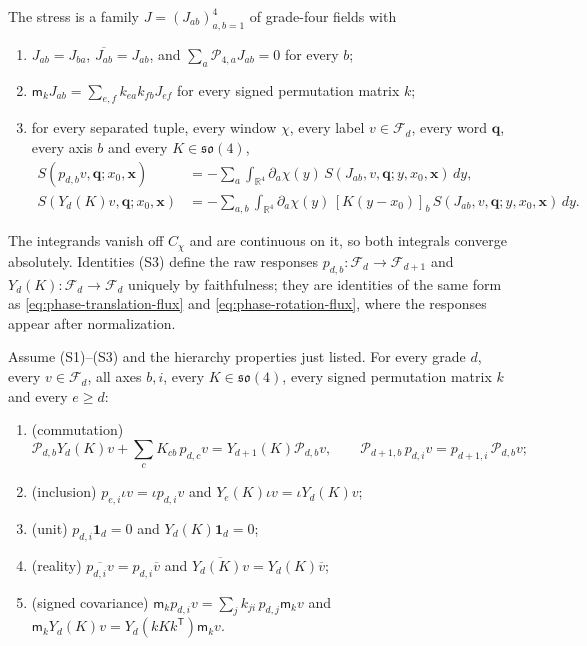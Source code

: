 The stress is a family $J=(J_{ab})_{a,b=1}^4$ of grade-four fields with
\begin{enumerate}
\item[(S1)] $J_{ab}=J_{ba}$, $\overline{J_{ab}}=J_{ab}$, and
  $\sum_a\mathcal P_{4,a}J_{ab}=0$ for every $b$;
\item[(S2)] $\mathsf m_kJ_{ab}=\sum_{e,f}k_{ea}k_{fb}J_{ef}$ for every
  signed permutation matrix $k$;
\item[(S3)] for every separated tuple, every window $\chi$, every label
  $v\in\mathcal F_d$, every word $\boldsymbol q$, every axis $b$ and every
  $K\in\mathfrak{so}(4)$,
\begin{align}
 S(p_{d,b}v,\boldsymbol q;x_0,\boldsymbol x)
 &=-\sum_a\int_{\mathbb R^4}\partial_a\chi(y)\,
     S(J_{ab},v,\boldsymbol q;y,x_0,\boldsymbol x)\,dy,
 \label{eq:ward-raw-translation-flux}\\
 S(Y_d(K)v,\boldsymbol q;x_0,\boldsymbol x)
 &=-\sum_{a,b}\int_{\mathbb R^4}\partial_a\chi(y)\,[K(y-x_0)]_b\,
     S(J_{ab},v,\boldsymbol q;y,x_0,\boldsymbol x)\,dy.
 \label{eq:ward-raw-rotation-flux}
\end{align}
\end{enumerate}
The integrands vanish off $C_\chi$ and are continuous on it, so both
integrals converge absolutely.  Identities (S3) define the raw responses
$p_{d,b}:\mathcal F_d\to\mathcal F_{d+1}$ and
$Y_d(K):\mathcal F_d\to\mathcal F_d$ uniquely by faithfulness; they are
identities of the same form as \eqref{eq:phase-translation-flux} and
\eqref{eq:phase-rotation-flux}, where the responses appear after
normalization.

\begin{lemma}\label{lem:ward-local-response-laws}
Assume (S1)--(S3) and the hierarchy properties just listed.  For every
grade $d$, every $v\in\mathcal F_d$, all axes $b,i$, every
$K\in\mathfrak{so}(4)$, every signed permutation matrix $k$ and every
$e\ge d$:
\begin{enumerate}
\item[(i)] (commutation)
\[
 \mathcal P_{d,b}Y_d(K)v+\sum_{c}K_{cb}\,p_{d,c}v
   =Y_{d+1}(K)\mathcal P_{d,b}v,
 \qquad
 \mathcal P_{d+1,b}\,p_{d,i}v=p_{d+1,i}\,\mathcal P_{d,b}v;
\]
\item[(ii)] (inclusion) $p_{e,i}\iota v=\iota p_{d,i}v$ and
  $Y_e(K)\iota v=\iota Y_d(K)v$;
\item[(iii)] (unit) $p_{d,i}\mathbf 1_d=0$ and $Y_d(K)\mathbf 1_d=0$;
\item[(iv)] (reality) $\overline{p_{d,i}v}=p_{d,i}\overline v$ and
  $\overline{Y_d(K)v}=Y_d(K)\overline v$;
\item[(v)] (signed covariance)
  $\mathsf m_kp_{d,i}v=\sum_jk_{ji}\,p_{d,j}\mathsf m_kv$ and
  $\mathsf m_kY_d(K)v=Y_d(kKk^{\mathsf T})\mathsf m_kv$.
\end{enumerate}
\end{lemma}

